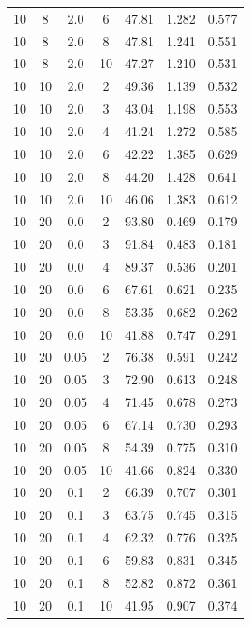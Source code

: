 \documentclass[11pt,a4paper]{article}
\begin{document}
\begin{longtable}{ccccccc}
        10 &  8  &  2.0  & 6 & 47.81 & 1.282 & 0.577 \\
        10 &  8  &  2.0  & 8 & 47.81 & 1.241 & 0.551 \\
        10 &  8  &  2.0  & 10 & 47.27 & 1.210 & 0.531 \\
        \midrule
        10 &  10  &  2.0  & 2 & 49.36 & 1.139 & 0.532 \\
        10 &  10  &  2.0  & 3 & 43.04 & 1.198 & 0.553 \\
        10 &  10  &  2.0  & 4 & 41.24 & 1.272 & 0.585 \\
        10 &  10  &  2.0  & 6 & 42.22 & 1.385 & 0.629 \\
        10 &  10  &  2.0  & 8 & 44.20 & 1.428 & 0.641 \\
        10 &  10  &  2.0  & 10 & 46.06 & 1.383 & 0.612 \\
        \midrule
        10 &  20  &  0.0  & 2 & 93.80 & 0.469 & 0.179 \\
        10 &  20  &  0.0  & 3 & 91.84 & 0.483 & 0.181 \\
        10 &  20  &  0.0  & 4 & 89.37 & 0.536 & 0.201 \\
        10 &  20  &  0.0  & 6 & 67.61 & 0.621 & 0.235 \\
        10 &  20  &  0.0  & 8 & 53.35 & 0.682 & 0.262 \\
        10 &  20  &  0.0  & 10 & 41.88 & 0.747 & 0.291 \\
        \midrule
        10 &  20  &  0.05  & 2 & 76.38 & 0.591 & 0.242 \\
        10 &  20  &  0.05  & 3 & 72.90 & 0.613 & 0.248 \\
        10 &  20  &  0.05  & 4 & 71.45 & 0.678 & 0.273 \\
        10 &  20  &  0.05  & 6 & 67.14 & 0.730 & 0.293 \\
        10 &  20  &  0.05  & 8 & 54.39 & 0.775 & 0.310 \\
        10 &  20  &  0.05  & 10 & 41.66 & 0.824 & 0.330 \\
        \midrule
        10 &  20  &  0.1  & 2 & 66.39 & 0.707 & 0.301 \\
        10 &  20  &  0.1  & 3 & 63.75 & 0.745 & 0.315 \\
        10 &  20  &  0.1  & 4 & 62.32 & 0.776 & 0.325 \\
        10 &  20  &  0.1  & 6 & 59.83 & 0.831 & 0.345 \\
        10 &  20  &  0.1  & 8 & 52.82 & 0.872 & 0.361 \\
        10 &  20  &  0.1  & 10 & 41.95 & 0.907 & 0.374 \\

\end{longtable}
\end{document}
